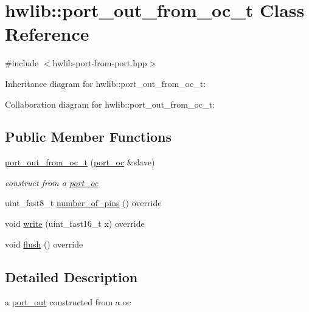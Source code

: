 \hypertarget{classhwlib_1_1port__out__from__oc__t}{}\section{hwlib\+:\+:port\+\_\+out\+\_\+from\+\_\+oc\+\_\+t Class Reference}
\label{classhwlib_1_1port__out__from__oc__t}


{\ttfamily \#include $<$hwlib-\/port-\/from-\/port.\+hpp$>$}



Inheritance diagram for hwlib\+:\+:port\+\_\+out\+\_\+from\+\_\+oc\+\_\+t\+:


Collaboration diagram for hwlib\+:\+:port\+\_\+out\+\_\+from\+\_\+oc\+\_\+t\+:
\subsection*{Public Member Functions}
\begin{DoxyCompactItemize}
\item 
\mbox{\label{classhwlib_1_1port__out__from__oc__t_a485b30cd70aded4074372d95ea23c8e7}} 
\hyperlink{classhwlib_1_1port__out__from__oc__t_a485b30cd70aded4074372d95ea23c8e7}{port\+\_\+out\+\_\+from\+\_\+oc\+\_\+t} (\hyperlink{classhwlib_1_1port__oc}{port\+\_\+oc} \&slave)
\begin{DoxyCompactList}\small\item\em construct from a \hyperlink{classhwlib_1_1port__oc}{port\+\_\+oc} \end{DoxyCompactList}\item 
uint\+\_\+fast8\+\_\+t \hyperlink{classhwlib_1_1port__out__from__oc__t_a25961246ca2c7433fc7534d479a58537}{number\+\_\+of\+\_\+pins} () override
\item 
void \hyperlink{classhwlib_1_1port__out__from__oc__t_a33a024caac179b1d82b82d09bfca7645}{write} (uint\+\_\+fast16\+\_\+t x) override
\item 
void \hyperlink{classhwlib_1_1port__out__from__oc__t_ae85b5828e71f11c12bfe78b54afb2088}{flush} () override
\end{DoxyCompactItemize}


\subsection{Detailed Description}
a \hyperlink{classhwlib_1_1port__out}{port\+\_\+out} constructed from a oc

